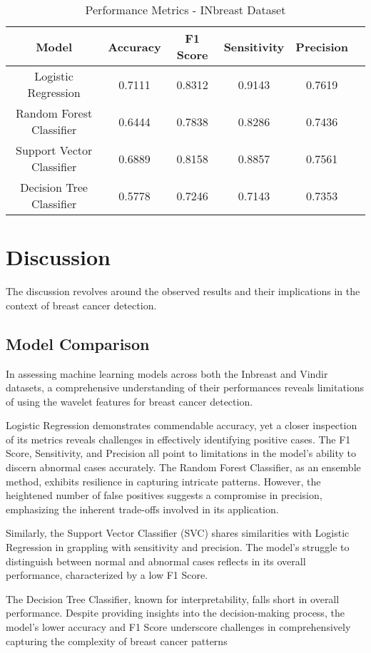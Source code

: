 \begin{table}[htbp]
  \centering
  \caption{Performance Metrics - INbreast Dataset}
  \begin{tabular}{|c|c|c|c|c|c|}
    \hline
    Model & Accuracy & F1 Score & Sensitivity & Precision \\
    \hline
    Logistic Regression & 0.7111 & 0.8312 & 0.9143 & 0.7619 \\
    Random Forest Classifier & 0.6444 & 0.7838 & 0.8286 & 0.7436 \\
    Support Vector Classifier & 0.6889 & 0.8158 & 0.8857 & 0.7561 \\
    Decision Tree Classifier & 0.5778 & 0.7246 & 0.7143 & 0.7353 \\
    \hline
  \end{tabular}
\end{table}

\section{Discussion}
The discussion revolves around the observed results and their implications in the context of breast cancer detection.
\subsection{Model Comparison}
In assessing machine learning models across both the Inbreast and Vindir datasets, a comprehensive understanding of their performances reveals limitations of using the wavelet features for breast cancer detection.

Logistic Regression demonstrates commendable accuracy, yet a closer inspection of its metrics reveals challenges in effectively identifying positive cases. The F1 Score, Sensitivity, and Precision all point to limitations in the model's ability to discern abnormal cases accurately.
The Random Forest Classifier, as an ensemble method, exhibits resilience in capturing intricate patterns. However, the heightened number of false positives suggests a compromise in precision, emphasizing the inherent trade-offs involved in its application.

Similarly, the Support Vector Classifier (SVC) shares similarities with Logistic Regression in grappling with sensitivity and precision. The model's struggle to distinguish between normal and abnormal cases reflects in its overall performance, characterized by a low F1 Score.

The Decision Tree Classifier, known for interpretability, falls short in overall performance. Despite providing insights into the decision-making process, the model's lower accuracy and F1 Score underscore challenges in comprehensively capturing the complexity of breast cancer patterns

